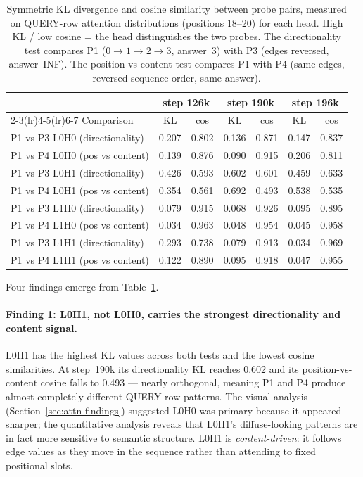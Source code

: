 \documentclass[11pt, a4paper]{article}
\begin{document}
\begin{table}[H]
\centering
\small
\begin{tabular}{@{}lcccccc@{}}
\toprule
 & \multicolumn{2}{c}{step 126k} & \multicolumn{2}{c}{step 190k} & \multicolumn{2}{c}{step 196k} \\
\cmidrule(lr){2-3}\cmidrule(lr){4-5}\cmidrule(lr){6-7}
Comparison & KL & cos & KL & cos & KL & cos \\
\midrule
P1 vs P3 \;L0H0\; (directionality)  & 0.207 & 0.802 & 0.136 & 0.871 & 0.147 & 0.837 \\
P1 vs P4 \;L0H0\; (pos vs content)  & 0.139 & 0.876 & 0.090 & 0.915 & 0.206 & 0.811 \\
\midrule
P1 vs P3 \;L0H1\; (directionality)  & 0.426 & 0.593 & 0.602 & 0.601 & 0.459 & 0.633 \\
P1 vs P4 \;L0H1\; (pos vs content)  & 0.354 & 0.561 & 0.692 & 0.493 & 0.538 & 0.535 \\
\midrule
P1 vs P3 \;L1H0\; (directionality)  & 0.079 & 0.915 & 0.068 & 0.926 & 0.095 & 0.895 \\
P1 vs P4 \;L1H0\; (pos vs content)  & 0.034 & 0.963 & 0.048 & 0.954 & 0.045 & 0.958 \\
\midrule
P1 vs P3 \;L1H1\; (directionality)  & 0.293 & 0.738 & 0.079 & 0.913 & 0.034 & 0.969 \\
P1 vs P4 \;L1H1\; (pos vs content)  & 0.122 & 0.890 & 0.095 & 0.918 & 0.047 & 0.955 \\
\bottomrule
\end{tabular}
\caption{Symmetric KL divergence and cosine similarity between probe pairs,
  measured on QUERY-row attention distributions (positions 18--20) for each
  head. High KL / low cosine = the head distinguishes the two probes. The
  directionality test compares P1 ($0{\to}1{\to}2{\to}3$, answer~3) with P3
  (edges reversed, answer~INF). The position-vs-content test compares P1 with
  P4 (same edges, reversed sequence order, same answer).}
\label{tab:probe-comparison}
\end{table}

Four findings emerge from Table~\ref{tab:probe-comparison}.

\paragraph{Finding 1: L0H1, not L0H0, carries the strongest directionality and
content signal.}
L0H1 has the highest KL values across both tests and the lowest cosine
similarities.  At step~190k its directionality KL reaches 0.602 and its
position-vs-content cosine falls to 0.493 --- nearly orthogonal, meaning P1 and
P4 produce almost completely different QUERY-row patterns.  The visual analysis
(Section~\ref{sec:attn-findings}) suggested L0H0 was primary because it appeared
sharper; the quantitative analysis reveals that L0H1's diffuse-looking patterns
are in fact more sensitive to semantic structure.  L0H1 is \emph{content-driven}:
it follows edge values as they move in the sequence rather than attending to fixed
positional slots.
\end{document}
